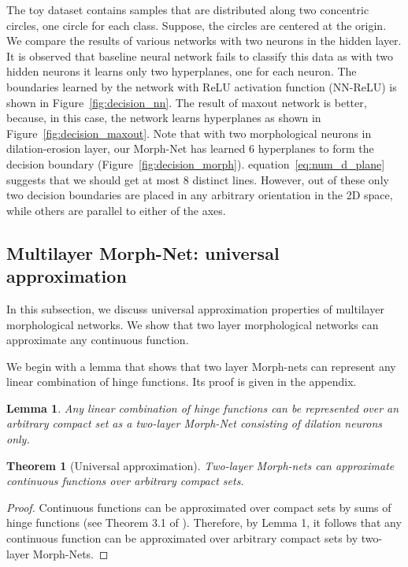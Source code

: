 \documentclass[12pt]{article}
\def\Figref#1{Figure~\ref{#1}}
\def\eqref#1{equation~\ref{#1}}
\newtheorem{theorem}{Theorem}
\newtheorem{lemma}{Lemma}
\begin{document}
The toy dataset contains samples that are distributed along two concentric circles, one circle for each class. Suppose, the circles are centered at the origin.
We compare the results of various networks with two neurons in the hidden layer. It is observed that baseline neural network fails to classify this data as with two hidden neurons it learns only two hyperplanes, one for each neuron. The boundaries learned by the network with ReLU activation function (NN-ReLU) is shown in \Figref{fig:decision_nn}. The result of maxout network is better,  
because, in this case, the network learns  hyperplanes as shown in \Figref{fig:decision_maxout}. 
Note that with two morphological neurons in dilation-erosion layer, our Morph-Net has learned 6 hyperplanes to form the decision boundary (\Figref{fig:decision_morph}).  \eqref{eq:num_d_plane} suggests that we should get at most 8 distinct lines. However, out of these only two decision boundaries are placed in any arbitrary orientation in the 2D space, while others are parallel to either of the axes. 

\subsection{Multilayer Morph-Net: universal approximation}
In this subsection, we discuss universal approximation properties of multilayer morphological networks. We show that two layer morphological networks can approximate any continuous function.

We begin with a lemma that shows that two layer Morph-nets can represent any linear combination of hinge functions. Its proof is given in the appendix.
\begin{lemma}
Any linear combination of hinge functions  can be represented over an arbitrary compact set  as a two-layer Morph-Net consisting of dilation neurons only.
\end{lemma} 

\begin{theorem}[Universal approximation]
Two-layer Morph-nets can approximate continuous functions over arbitrary compact sets.
\end{theorem}

\begin{proof}
Continuous functions can be approximated over compact sets by sums of hinge functions (see Theorem 3.1 of \cite{breiman1993hinging}). Therefore, by Lemma 1, it follows that any continuous function can be approximated over arbitrary compact sets by two-layer Morph-Nets.
\end{proof}
\end{document}
